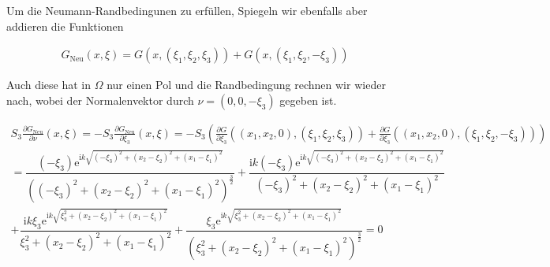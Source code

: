 \begin{solution}
\begin{enumerate}[label = (\roman*)]
Um die Neumann-Randbedingunen zu erfüllen, Spiegeln wir ebenfalls aber addieren die Funktionen

\begin{align*}
  G_\mathrm{Neu}(x,\xi) = G(x,(\xi_1, \xi_2, \xi_3)) + G(x,(\xi_1,\xi_2, -\xi_3))
\end{align*}

Auch diese hat in $\Omega$ nur einen Pol und die Randbedingung rechnen wir wieder nach, wobei der Normalenvektor durch $\nu = (0,0,-\xi_3)$ gegeben ist.

\begin{align*}
  S_3\frac{\partial G_\mathrm{Neu}}{\partial \nu}(x, \xi)
  =
  -S_3\frac{\partial G_\mathrm{Neu}}{\partial \xi_3}(x, \xi)
  =
  -S_3(\frac{\partial G}{\partial \xi_3}((x_1,x_2,0),(\xi_1, \xi_2, \xi_3)) + \frac{\partial G}{\partial \xi_3}((x_1,x_2,0),(\xi_1,\xi_2, -\xi_3))) \\
  =
  \dfrac{\left(-{\xi}_3\right)\mathrm{e}^{\mathrm{i}k\sqrt{\left(-{\xi}_3\right)^2+\left(x_2-{\xi}_2\right)^2+
  \left(x_1-{\xi}_1\right)^2}}}{\left(\left(-{\xi}_3\right)^2+\left(x_2-{\xi}_2\right)^2+
  \left(x_1-{\xi}_1\right)^2\right)^\frac{3}{2}}
  +
  \dfrac{\mathrm{i}k\left(-{\xi}_3\right)\mathrm{e}^{\mathrm{i}k
  \sqrt{\left(-{\xi}_3\right)^2+\left(x_2-{\xi}_2\right)^2+\left(x_1-{\xi}_1\right)^2}}}{\left(-{\xi}_3\right)^2+
  \left(x_2-{\xi}_2\right)^2+\left(x_1-{\xi}_1\right)^2} \\
  +
  \dfrac{\mathrm{i}k\xi_3\mathrm{e}^{\mathrm{i}k\sqrt{\xi_3^2+\left(x_2-{\xi}_2\right)^2+
  \left(x_1-{\xi}_1\right)^2}}}{\xi_3^2+\left(x_2-{\xi}_2\right)^2+\left(x_1-{\xi}_1\right)^2}
  +
  \dfrac{\xi_3\mathrm{e}^{\mathrm{i}k\sqrt{\xi_3^2+\left(x_2-{\xi}_2\right)^2+
  \left(x_1-{\xi}_1\right)^2}}}{\left(\xi_3^2+\left(x_2-{\xi}_2\right)^2+\left(x_1-{\xi}_1\right)^2\right)^\frac{3}{2}}
  =
  0
\end{align*}
\end{enumerate}
\end{solution}

